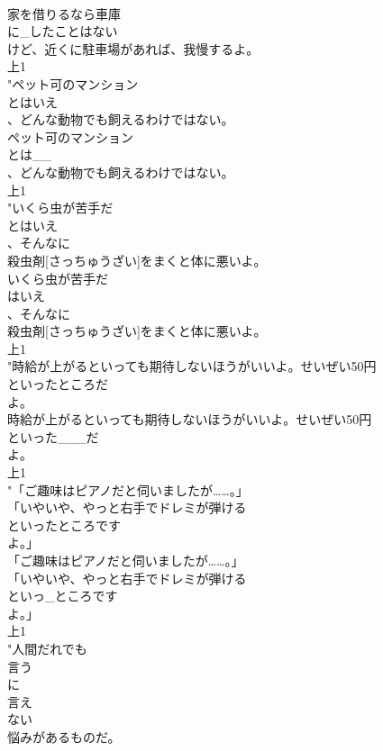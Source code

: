 \documentclass[8pt]{extreport}
\begin{document}
\begin{CJK}{UTF8}{min}
\\	家を借りるなら車庫
\\	に_したことはない
\\	けど、近くに駐車場があれば、我慢するよ。
\\	上1
\\	"ペット可のマンション
\\	とはいえ
\\	、どんな動物でも飼えるわけではない。
\\	ペット可のマンション
\\	とは__
\\	、どんな動物でも飼えるわけではない。
\\	上1
\\	"いくら虫が苦手だ
\\	とはいえ
\\	、そんなに
\\	殺虫剤[さっちゅうざい]をまくと体に悪いよ。
\\	いくら虫が苦手だ
\\	はいえ
\\	、そんなに
\\	殺虫剤[さっちゅうざい]をまくと体に悪いよ。
\\	上1
\\	"時給が上がるといっても期待しないほうがいいよ。せいぜい50円
\\	といったところだ
\\	よ。
\\	時給が上がるといっても期待しないほうがいいよ。せいぜい50円
\\	といった___だ
\\	よ。
\\	上1
\\	"「ご趣味はピアノだと伺いましたが……。」
\\	「いやいや、やっと右手でドレミが弾ける
\\	といったところです
\\	よ。」
\\	「ご趣味はピアノだと伺いましたが……。」
\\	「いやいや、やっと右手でドレミが弾ける
\\	といっ_ところです
\\	よ。」
\\	上1
\\	"人間だれでも
\\	言う
\\	に
\\	言え
\\	ない
\\	悩みがあるものだ。

\end{CJK}
\end{document}
